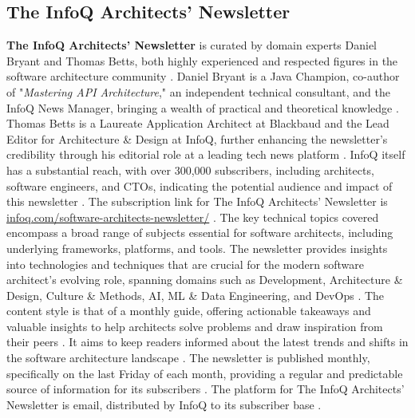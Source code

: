 \documentclass[11pt]{article}
\begin{document}
\subsection{The InfoQ Architects' Newsletter}
\textbf{The InfoQ Architects' Newsletter} is curated by domain experts Daniel Bryant and Thomas Betts, both highly experienced and respected figures in the software architecture community \citep{infoq2025newsletter}. Daniel Bryant is a Java Champion, co-author of "\textit{Mastering API Architecture}," an independent technical consultant, and the InfoQ News Manager, bringing a wealth of practical and theoretical knowledge \citep{infoq2025newsletter}. Thomas Betts is a Laureate Application Architect at Blackbaud and the Lead Editor for Architecture \& Design at InfoQ, further enhancing the newsletter's credibility through his editorial role at a leading tech news platform \citep{infoq2025newsletter}. InfoQ itself has a substantial reach, with over 300,000 subscribers, including architects, software engineers, and CTOs, indicating the potential audience and impact of this newsletter \citep{infoq2025newsletter}. The subscription link for The InfoQ Architects' Newsletter is \url{infoq.com/software-architects-newsletter/} \citep{infoq2025newsletter}. The key technical topics covered encompass a broad range of subjects essential for software architects, including underlying frameworks, platforms, and tools. The newsletter provides insights into technologies and techniques that are crucial for the modern software architect's evolving role, spanning domains such as Development, Architecture \& Design, Culture \& Methods, AI, ML \& Data Engineering, and DevOps \citep{infoq2025newsletter}. The content style is that of a monthly guide, offering actionable takeaways and valuable insights to help architects solve problems and draw inspiration from their peers \citep{infoq2025newsletter}. It aims to keep readers informed about the latest trends and shifts in the software architecture landscape \citep{infoq2025newsletter}. The newsletter is published monthly, specifically on the last Friday of each month, providing a regular and predictable source of information for its subscribers \citep{infoq2025newsletter}. The platform for The InfoQ Architects' Newsletter is email, distributed by InfoQ to its subscriber base \citep{infoq2025newsletter}.
\end{document}

